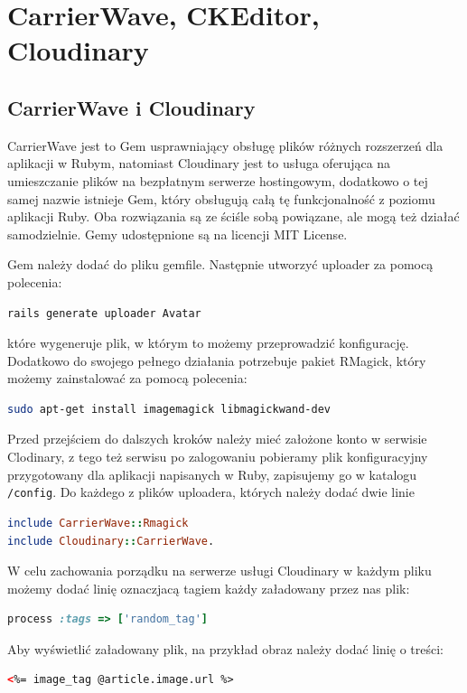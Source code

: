 \documentclass[openright]{xmgr}
\begin{document}
\newpage

\section{CarrierWave, CKEditor, Cloudinary}
\subsection{CarrierWave i Cloudinary}
CarrierWave \cite{carrierwave} jest to Gem usprawniający obsługę plików różnych rozszerzeń dla aplikacji w Rubym, natomiast Cloudinary jest to usługa oferująca na umieszczanie plików na bezpłatnym serwerze hostingowym, dodatkowo o tej samej nazwie istnieje Gem, który obsługują całą tę funkcjonalność z poziomu aplikacji Ruby. Oba rozwiązania są ze ściśle sobą powiązane, ale mogą też działać samodzielnie. Gemy udostępnione są na licencji MIT License. 

Gem należy dodać do pliku gemfile. Następnie utworzyć uploader za pomocą polecenia: 
\begin{lstlisting}[language=bash]
rails generate uploader Avatar
\end{lstlisting}
które wygeneruje plik, w którym to możemy przeprowadzić konfigurację. Dodatkowo do swojego pełnego działania potrzebuje pakiet RMagick, który możemy zainstalować za pomocą polecenia: 
\begin{lstlisting}[language=bash, caption={Polecenie instalujące oprogramowanie RMagick}]
sudo apt-get install imagemagick libmagickwand-dev
\end{lstlisting}
Przed przejściem do dalszych kroków należy mieć założone konto w serwisie Clodinary, z tego też serwisu po zalogowaniu pobieramy plik konfiguracyjny przygotowany dla aplikacji napisanych w Ruby, zapisujemy go w katalogu \texttt{/config}. Do każdego z plików uploadera, których należy dodać dwie linie 
\begin{lstlisting}[language=ruby, caption={Framgent zawartości pliku uploadera}]
include CarrierWave::Rmagick
include Cloudinary::CarrierWave.
\end{lstlisting}

\newpage

W celu zachowania porządku na serwerze usługi Cloudinary w każdym pliku możemy dodać linię oznaczjacą tagiem każdy załadowany przez nas plik: 
\begin{lstlisting}[language=ruby, caption={Przykładowy tag dla pliku}]
process :tags => ['random_tag']
\end{lstlisting}
Aby wyświetlić załadowany plik, na przykład obraz należy dodać linię o treści: 
\begin{lstlisting}[language=html, caption={Kod wyświetlający obraz}]
<%= image_tag @article.image.url %>
\end{lstlisting}
\end{document}
